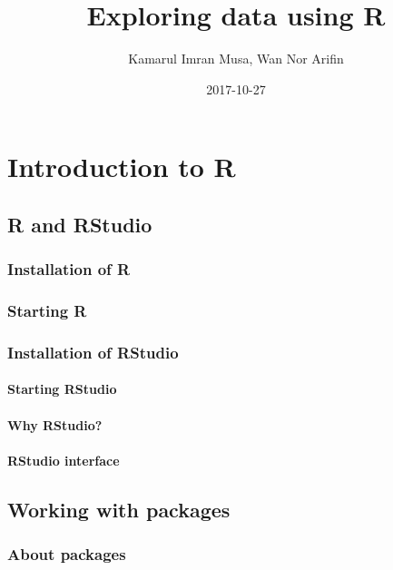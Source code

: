 \documentclass[]{book}
\title{Exploring data using R}
\author{Kamarul Imran Musa, Wan Nor Arifin}
\date{2017-10-27}
\theoremstyle{definition}
\theoremstyle{definition}
\theoremstyle{definition}
\theoremstyle{remark}
\begin{document}
\maketitle

{
\setcounter{tocdepth}{1}
\tableofcontents
}
\chapter{Introduction to R}\label{introduction-to-r}

\section{R and RStudio}\label{r-and-rstudio}

\subsection{Installation of R}\label{installation-of-r}

\subsection{Starting R}\label{starting-r}

\subsection{Installation of RStudio}\label{installation-of-rstudio}

\subsubsection{Starting RStudio}\label{starting-rstudio}

\subsubsection{Why RStudio?}\label{why-rstudio}

\subsubsection{RStudio interface}\label{rstudio-interface}

\section{Working with packages}\label{working-with-packages}

\subsection{About packages}\label{about-packages}
\end{document}

